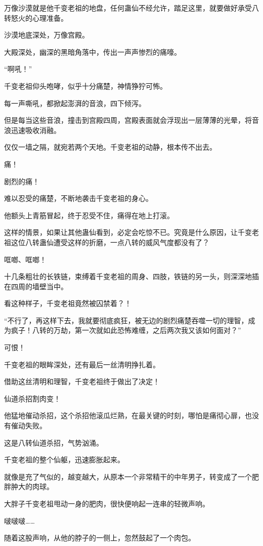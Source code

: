 \begin{this_body}
万像沙漠就是他千变老祖的地盘，任何蛊仙不经允许，踏足这里，就要做好承受八转怒火的心理准备。

沙漠地底深处，万像宫殿。

大殿深处，幽深的黑暗角落中，传出一声声惨烈的痛嚎。

“啊吼！”

千变老祖仰头咆哮，似乎十分痛楚，神情狰狞可怖。

每一声嘶吼，都掀起澎湃的音浪，四下倾泻。

但是每当这些音浪，撞击到宫殿四周，宫殿表面就会浮现出一层薄薄的光晕，将音浪迅速吸收消融。

仅仅一墙之隔，就宛若两个天地。千变老祖的动静，根本传不出去。

痛！

剧烈的痛！

难以忍受的痛楚，不断地袭击千变老祖的身心。

他额头上青筋冒起，终于忍受不住，痛得在地上打滚。

这样的情景，如果让其他蛊仙看到，必定会吃惊不已。究竟是什么原因，让千变老祖这位八转蛊仙遭受这样的折磨，一点八转的威风气度都没有了？

哐啷、哐啷！

十几条粗壮的长铁链，束缚着千变老祖的周身、四肢，铁链的另一头，则深深地插在四周的墙壁当中。

看这种样子，千变老祖竟然被囚禁着？！

“不行了，再这样下去，我就要彻底疯狂，被无边的剧烈痛楚吞噬一切的理智，成为疯子！八转的万劫，第一次就如此恐怖难缠，之后两次我又该如何面对？”

可恨！

千变老祖的眼眸深处，还有最后一丝清明挣扎着。

借助这丝清明和理智，千变老祖终于做出了决定！

仙道杀招割肉变！

他猛地催动杀招，这个杀招他滚瓜烂熟，在最关键的时刻，哪怕是痛彻心扉，也没有催动失败。

这是八转仙道杀招，气势汹涌。

千变老祖的整个仙躯，迅速膨胀起来。

就像是充了气似的，越变越大，从原本一个非常精干的中年男子，转变成了一个肥胖肿大的肉球。

大胖子千变老祖甩动一身的肥肉，很快便响起一连串的轻微声响。

啵啵啵……

随着这股声响，从他的脖子的一侧上，忽然鼓起了一个肉包。


\end{this_body}
